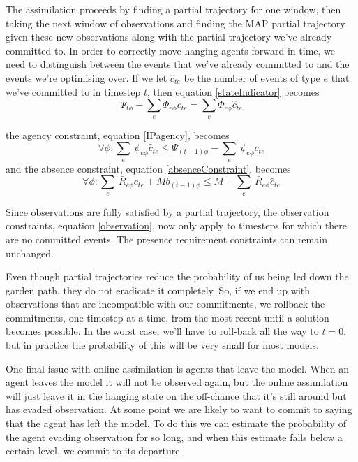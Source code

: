 \documentclass{article}
\begin{document}
The assimilation proceeds by finding a partial trajectory for one window, then taking the next window of observations and finding the MAP partial trajectory given these new observations along with the partial trajectory we've already committed to. In order to correctly move hanging agents forward in time, we need to distinguish between the events that we've already committed to and the events we're optimising over. If we let $\hat{c}_{te}$ be the number of events of type $e$ that we've committed to in timestep $t$, then equation \ref{stateIndicator} becomes
\begin{equation}
\Psi_{t\phi} -  \sum_e\Phi_{e\phi}c_{te} = \sum_e\Phi_{e\phi}\hat{c}_{te}
\label{stateIndicator}
\end{equation}


the agency constraint, equation \ref{IPagency}, becomes
\begin{equation}
\forall\phi:  \sum_e\ \psi_{e\phi}\hat{c}_{te} \le \Psi_{(t-1)\phi}  -  \sum_e\ \psi_{e\phi} c_{te}
\end{equation}
and the absence constraint, equation \ref{absenceConstraint}, becomes
\begin{equation}
\forall\phi: \sum_e\ \bar{R}_{e\phi} c_{te} + Mb_{(t-1)\phi} \le M - \sum_e\ \bar{R}_{e\phi} \hat{c}_{te}
\end{equation}

Since observations are fully satisfied by a partial trajectory, the observation constraints, equation \ref{observation}, now only apply to timesteps for which there are no committed events. The presence requirement constraints can remain unchanged.

Even though partial trajectories reduce the probability of us being led down the garden path, they do not eradicate it completely. So, if we end up with observations that are incompatible with our commitments, we rollback the commitments, one timestep at a time, from the most recent until a solution becomes possible. In the worst case, we'll have to roll-back all the way to $t=0$, but in practice the probability of this will be very small for most models.

One final issue with online assimilation is agents that leave the model. When an agent leaves the model it will not be observed again, but the online assimilation will just leave it in the hanging state on the off-chance that it's still around but has evaded observation. At some point we are likely to want to commit to saying that the agent has left the model. To do this we can estimate the probability of the agent evading observation for so long, and when this estimate falls below a certain level, we commit to its departure.
\end{document}
